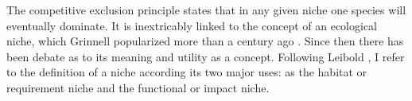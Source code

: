 The competitive exclusion principle states that in any given niche one species will eventually dominate. %
It is inextricably linked to the concept of an ecological niche, which Grinnell popularized more than a century ago \cite{Grinnell2917}. 
Since then there has been debate as to its meaning and utility as a concept. 
Following Leibold \cite{Leibold1995}, I refer to the definition of a niche according its two major uses: as the habitat or requirement niche and the functional or impact niche.

